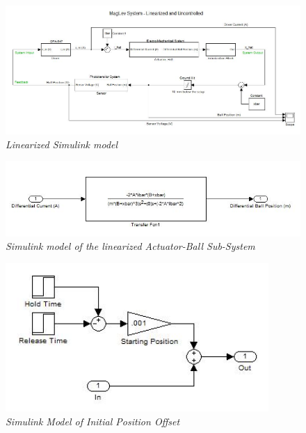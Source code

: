 \documentclass{article}
\theoremstyle{plain}
\theoremstyle{definition}
\theoremstyle{remark}
\begin{document}

\begin{figure}
\begin{center}
\includegraphics[width = 15cm]{LinearUnControlledComplete}
\caption{\emph{Linearized Simulink model}}
\label{Q1_e6}
\end{center}
\end{figure}

\begin{figure}
\begin{center}
\includegraphics[width = 15cm]{LinearUnControlledActuatorBall}
\caption{\emph{Simulink model of the linearized Actuator-Ball Sub-System}}
\label{Q1_e7}
\end{center}
\end{figure}

\begin{figure}
\begin{center}
\includegraphics[width = 10cm]{LinearUnControlledInitialization}
\caption{\emph{Simulink Model of Initial Position Offset}}
\label{Q1_e8}
\end{center}
\end{figure}
\end{document}
